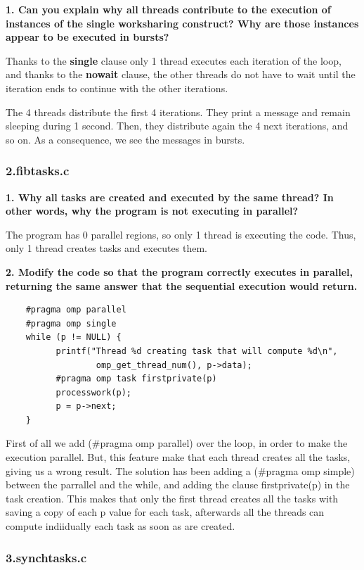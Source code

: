 \documentclass[12pt, a4paper]{article}
\begin{document}
\textbf{1. Can you explain why all threads contribute to the execution of instances of the single worksharing construct? Why are those instances appear to be executed in bursts?}

Thanks to the \textbf{single} clause only 1 thread executes each iteration of the loop, and thanks to the \textbf{nowait} clause, the other threads do not have to wait until the iteration ends to continue with the other iterations.

The 4 threads distribute the first 4 iterations. They print a message and remain sleeping during 1 second. Then, they distribute again the 4 next iterations, and so on. As a consequence, we see the messages in bursts.

\subsubsection{2.fibtasks.c}

\textbf{1. Why all tasks are created and executed by the same thread? In other words, why the program is not executing in parallel?}

The program has 0 parallel regions, so only 1 thread is executing the code. Thus, only 1 thread creates tasks and executes them.

\hfill

\textbf{2. Modify the code so that the program correctly executes in parallel, returning the same answer that the sequential execution would return.}

\begin{lstlisting}
	#pragma omp parallel
    #pragma omp single
    while (p != NULL) {
          printf("Thread %d creating task that will compute %d\n",
          		  omp_get_thread_num(), p->data);
          #pragma omp task firstprivate(p)
          processwork(p);
          p = p->next;
    }
\end{lstlisting}

First of all we add (\#pragma omp parallel) over the loop, in order to make the execution parallel. But, this feature make that each thread creates all the tasks, giving us a wrong result.
The solution has been adding a (\#pragma omp simple) between the parrallel and the while, and adding the clause firstprivate(p) in the task creation.
This makes that only the first thread creates all the tasks with saving a copy of each p value for each task, afterwards all the threads can compute indiidually each task as soon as are created.

\subsubsection{3.synchtasks.c}
\end{document}
